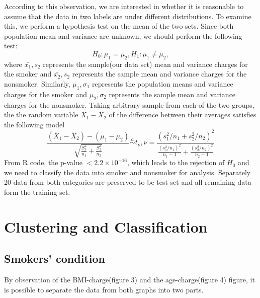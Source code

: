 \documentclass[12pt,a4paper]{article}
\begin{document}
According to this observation, we are interested in whether it is reasonable to assume that the data in two labels are under different distributions. To examine this, we perform a hypothesis test on the mean of the two sets. Since both population mean and variance are unknown, we should perform the following test:
$$H_0: \mu_1=\mu_2,  H_1: \mu_1\ne \mu_2,$$
where $\bar{x_1}, s_2$ represents the sample(our data set) mean and variance charges for the smoker and $\bar{x_2}, s_2$ represents the sample mean and variance charges for the nonsmoker. Similarly, $\mu_1,\sigma_1$ represents the population means and variance charges for the smoker and $\mu_2,\sigma_2$ represents the sample mean and variance charges for the nonsmoker. 
Taking arbitrary sample from each of the two groups, the the random variable $\bar{X_1}-\bar{X_2}$ of the difference between their averages satisfies the following model
$$\frac{\left(\bar{X}_{1}-\bar{X}_{2}\right)-\left(\mu_{1}-\mu_{2}\right)}{\sqrt{\frac{S_{1}^{2}}{n_{1}}+\frac{S_{2}^{2}}{n_{2}}}} \stackrel{a}{\sim} t_{\nu}, \nu=\frac{\left(s_{1}^{2} / n_{1}+s_{2}^{2} / n_{2}\right)^{2}}{\frac{\left(s_{1}^{2} / n_{1}\right)^{2}}{n_{1}-1}+\frac{\left(s_{2}^{2} / n_{2}\right)^{2}}{n_{2}-1}}$$
From R code, the p-value $<2.2\times 10^{-16} $, which leads to the rejection of $H_0$ and we need to classify the data into smoker and nonsmoker for analysis. Separately 20 data from both categories are preserved to be test set and all remaining data form the training set.


\section{Clustering and Classification}
\subsection{Smokers' condition}

By observation of the BMI-charge(figure 3) and the age-charge(figure 4) figure, it is possible to separate the data from both graphs into two parts. 
\end{document}
